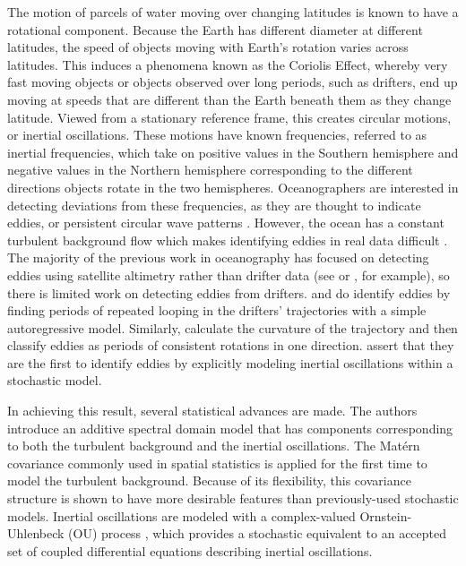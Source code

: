 \documentclass{stat572Style}
\begin{document}
\par
The motion of parcels of water moving over changing latitudes is known to have a rotational component. 
Because the Earth has  different diameter at different latitudes, the speed of objects moving with Earth's rotation varies across latitudes.  
This induces a phenomena known as the Coriolis Effect, whereby very fast moving objects or objects observed over long periods, such as drifters, end up moving at speeds that are different than the Earth beneath them as they change latitude. 
Viewed from a stationary reference frame, this creates circular motions, or inertial oscillations. 
These motions have known frequencies, referred to as inertial frequencies, which take on positive values in the Southern hemisphere and negative values in the Northern hemisphere corresponding to the different directions objects rotate in the two hemispheres.
 Oceanographers  are interested in detecting deviations from these frequencies, as they are thought to indicate eddies, or persistent circular wave patterns \citep{Kunze1985}.
  However, the ocean has a constant turbulent background flow which makes identifying eddies in real data difficult \citep{ Elipot2010}.
 The majority of the previous work in oceanography has focused on detecting eddies using satellite altimetry rather than drifter data (see \citep{Isern2003} or \citep{Fu2010}, for example), so there is limited work on detecting eddies from drifters.
\citet{Shoosmith2005} and \citet{Lankhorst2006} do identify eddies by finding periods of repeated looping in the drifters' trajectories with a simple autoregressive model.
 Similarly, \citet{Boebel2003} calculate the curvature of the trajectory  and then classify eddies as periods of consistent rotations in one direction. 
 \citet{Sykulski2016} assert that they are the first to identify eddies by explicitly modeling inertial oscillations within a stochastic model.  
 \par
In achieving this result, several statistical advances are made.  
The authors introduce an additive spectral domain model that has components corresponding to both the turbulent background and the inertial oscillations. 
The Mat\'{e}rn covariance commonly used in spatial statistics \citep{Gneiting2012} is applied for the first time to model the turbulent background. 
Because of its flexibility, this covariance structure is shown to have more desirable features than previously-used stochastic models. 
Inertial oscillations are modeled with a complex-valued Ornstein-Uhlenbeck (OU) process \citep{Arato1962, Jeffreys1968}, which provides a stochastic equivalent to an accepted set of coupled differential equations describing inertial oscillations. 
\end{document}
